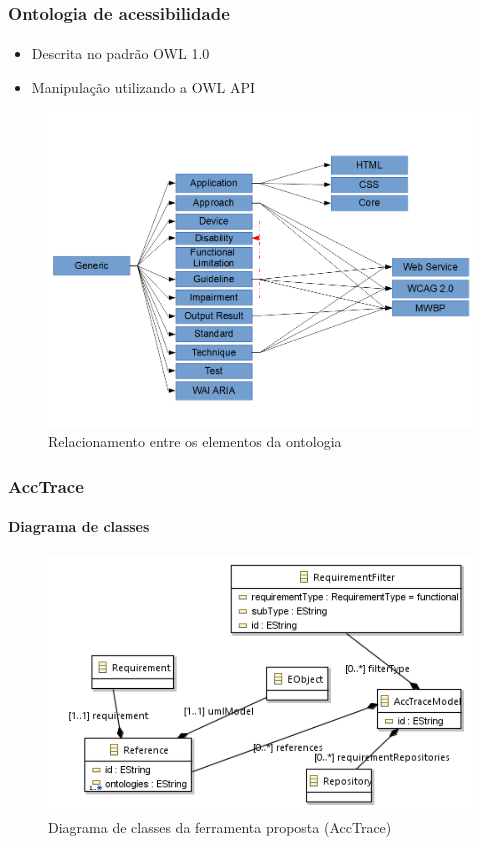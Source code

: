 \documentclass{beamer}
\begin{document}
\begin{frame}
\frametitle{Ontologia de acessibilidade}
\framesubtitle{}

\begin{itemize}
  \item Descrita no padrão OWL 1.0
  \item Manipulação utilizando a OWL API \citep{owlapi:13}
\end{itemize}

\begin{figure}[htbp] \centering
	\includegraphics[width=\textwidth,height=.50\textheight,keepaspectratio]{./img/ontologyrelationship.png}
	\caption{Relacionamento entre os elementos da ontologia}
	\label{fig:ontologyrelationship}
\end{figure}

\end{frame}

\begin{frame}
\frametitle{AccTrace}
\framesubtitle{Diagrama de classes}

\begin{figure}[htbp] \centering
	\includegraphics[width=\textwidth,height=.65\textheight,keepaspectratio]{./img/acctraceclassdiagram.png}
	\caption{Diagrama de classes da ferramenta proposta (AccTrace)}
	\label{fig:acctraceclassdiagram}
\end{figure}

\end{frame}
\end{document}
